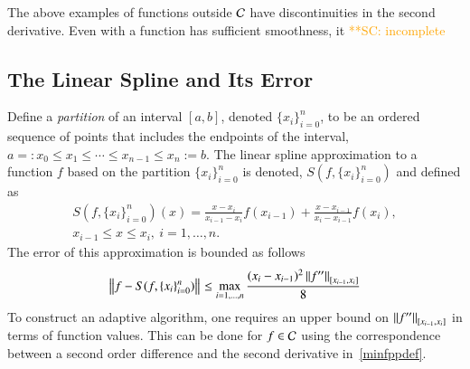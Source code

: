 \documentclass[review]{elsarticle}
\newcommand{\datasites}{\{x_i\}_{i=0}^n}
\newcommand{\scnote}[1]{ {\textcolor{orange}  {\mbox{**SC:} #1}}}
\begin{document}
The above examples of functions outside $\cc$ have discontinuities in the second
derivative. Even with a function has sufficient smoothness, it \scnote{incomplete}

\subsection{The Linear Spline and Its Error}

Define a \emph{partition} of an interval $[a, b]$, denoted $\datasites$, to be
an ordered sequence of points that includes the endpoints of the interval,
$a=:x_0 \le x_1 \le \cdots \le x_{n-1} \le x_{n}:=b$. The linear spline
approximation to a function $f$ based on the partition $\datasites$ is denoted,
$S(f,\datasites)$ and defined as
\begin{multline} \label{splinedef}
S(f,\datasites)(x) =  \frac{x-x_i}{x_{i-1} - x_i} f(x_{i-1}) + \frac{x-x_{i-1}}{x_{i} - x_{i-1}}f(x_i), \\ x_{i-1} \le x \le x_i, \ i=1, \ldots, n.
\end{multline}
The error of this approximation is bounded as follows
\begin{equation} \label{appxerrbda}
\norm{f - S(f,\datasites)} \le \max_{i=1, \ldots, n} \frac{(x_i - x_{i-1})^2\norm[{[x_{i-1},x_i]}]{f''}}{8}
\end{equation}
To construct an adaptive algorithm, one requires an upper bound on
$\norm[{[x_{i-1},x_i]}]{f''}$ in terms of function values. This can be done for
$f \in \cc$ using the correspondence between a second order difference and the
second derivative in~\eqref{minfppdef}.
\end{document}
